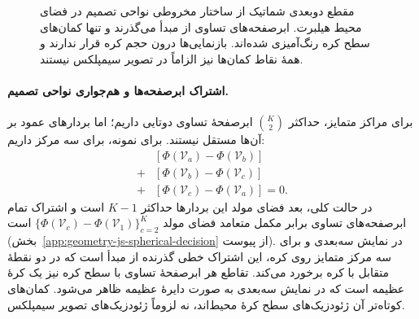\begin{figure}[!htbp]
\centering
\begin{LTR}
\centering
{}
\end{LTR}
\caption{مقطع دوبعدی شماتیک از ساختار مخروطی نواحی
تصمیم در فضای محیط هیلبرت. ابرصفحه‌های تساوی از مبدأ
می‌گذرند و تنها کمان‌های سطح کره رنگ‌آمیزی شده‌اند.
بازنمایی‌ها درون حجم کره قرار ندارند و همهٔ نقاط
کمان‌ها نیز الزاماً در تصویر سیمپلکس نیستند.}
\label{cmp:fig:ch3-js-conic-decision}
\end{figure}

\paragraph{اشتراک ابرصفحه‌ها و هم‌جواری نواحی تصمیم.}
برای مراکز متمایز، حداکثر $\binom{K}{2}$ ابرصفحهٔ
تساوی دوتایی داریم؛ اما بردارهای عمود بر آن‌ها
مستقل نیستند. برای نمونه، برای سه مرکز داریم:
\[
\begin{aligned}
&[\Phi(\mathcal V_a)-\Phi(\mathcal V_b)]\\
+{}&[\Phi(\mathcal V_b)-\Phi(\mathcal V_c)]\\
+{}&[\Phi(\mathcal V_c)-\Phi(\mathcal V_a)]=0.
\end{aligned}
\]
در حالت کلی، بعد فضای مولد این بردارها حداکثر
$K-1$ است و اشتراک تمام ابرصفحه‌های تساوی برابر
مکمل متعامد فضای مولد
$\{\Phi(\mathcal V_c)-\Phi(\mathcal V_1)\}_{c=2}^{K}$
است (بخش~\ref{app:geometry-js-spherical-decision}
از پیوست). در نمایش سه‌بعدی و برای سه مرکز
متمایز روی کره، این اشتراک خطی گذرنده از مبدأ است
که در دو نقطهٔ متقابل با کره برخورد می‌کند.
تقاطع هر ابرصفحهٔ تساوی با سطح کره نیز یک کرهٔ
عظیمه است که در نمایش سه‌بعدی به صورت دایرهٔ
عظیمه ظاهر می‌شود. کمان‌های کوتاه‌تر آن
ژئودزیک‌های سطح کرهٔ محیط‌اند، نه لزوماً
ژئودزیک‌های تصویر سیمپلکس.

